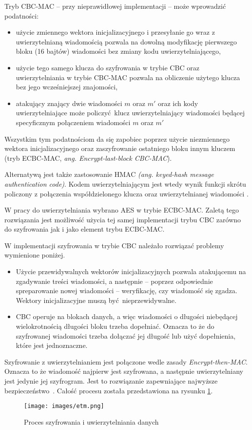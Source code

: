 Tryb CBC-MAC -- przy nieprawidłowej implementacji -- może wprowadzić podatności:

\begin{itemize}
    \item użycie zmiennego wektora inicjalizacyjnego i przesyłanie go wraz z uwierzytelnianą wiadomością pozwala na dowolną modyfikację pierwszego bloku (16 bajtów) wiadomości bez zmiany kodu uwierzytelniającego,
    \item użycie tego samego klucza do szyfrowania w trybie CBC oraz uwierzytelniania w trybie CBC-MAC pozwala na obliczenie użytego klucza bez jego wcześniejszej znajomości,
    \item atakujący znający dwie wiadomości $ m $ oraz $ m' $ oraz ich kody uwierzytelniające może policzyć klucz uwierzytelniający wiadomości będącej specyficznym połączeniem wiadomości $ m $ oraz $ m' $
\end{itemize}

Wszystkim tym podatnościom da się zapobiec poprzez użycie niezmiennego wektora inicjalizacyjnego oraz zaszyfrowanie ostatniego bloku innym kluczem (tryb ECBC-MAC, {\itshape ang. Encrypt-last-block CBC-MAC}).

Alternatywą jest także zastosowanie HMAC {\itshape (ang. keyed-hash message authentication code)}. Kodem uwierzytelniającym jest wtedy wynik funkcji skrótu policzony z połączenia współdzielonego klucza oraz uwierzytelnianej wiadomości \cite{krawczyk1997hmac}.

W pracy do uwierzytelniania wybrano AES w trybie ECBC-MAC. Zaletą tego rozwiązania jest możliwość użycia tej samej implementacji trybu CBC zarówno do szyfrowania jak i jako element trybu ECBC-MAC.

W implementacji szyfrowania w trybie CBC należało rozwiązać problemy wymienione poniżej.

\begin{itemize}
    \item Użycie przewidywalnych wektorów inicjalizacyjnych pozwala atakującemu na zgadywanie treści wiadomości, a następnie -- poprzez odpowiednie spreparowanie nowej wiadomości -- weryfikację, czy wiadomość się zgadza. Wektory inicjalizacyjne muszą być nieprzewidywalne.
    \item CBC operuje na blokach danych, a więc wiadomości o długości niebędącej wielokrotnością długości bloku trzeba dopełniać. Oznacza to że do szyfrowanej wiadomości trzeba dołączać jej długość lub użyć dopełnienia, które jest jednoznaczne.
\end{itemize}

Szyfrowanie z uwierzytelnianiem jest połączone wedle zasady {\itshape Encrypt-then-MAC}. Oznacza to że wiadomość najpierw jest szyfrowana, a następnie uwierzytelniany jest jedynie jej szyfrogram. Jest to rozwiązanie zapewniające najwyższe bezpieczeństwo~\cite{black2011authenticated}. Całość procesu została przedstawiona na rysunku \ref{fig:etm}.

\begin{figure}[h]
\centering
\texttt{[image: images/etm.png]}
\caption{Proces szyfrowania i uwierzytelniania danych}
\label{fig:etm}
\end{figure}
